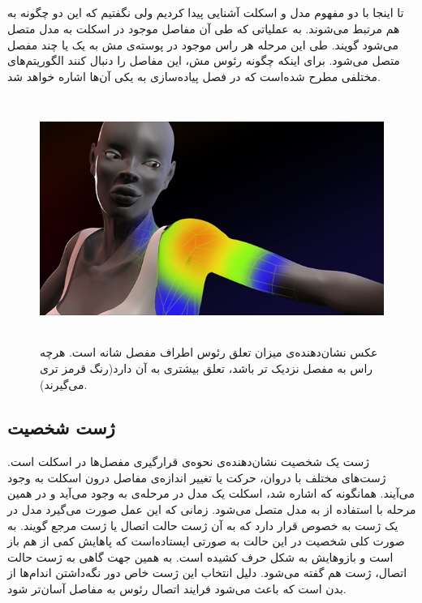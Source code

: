 \subsection{
}

تا اینجا با دو مفهوم مدل و اسکلت آشنایی پیدا کردیم ولی نگفتیم که این دو چگونه به هم مرتبط می‌شوند.
به عملیاتی که طی آن مفاصل موجود در اسکلت به مدل متصل می‌شود 
گویند.
طی این مرحله هر راس موجود در پوسته‌ی مش به یک یا چند مفصل متصل می‌شود.
برای اینکه چگونه رئوس مش، این مفاصل را دنبال کنند الگوریتم‌های مختلفی مطرح شده‌است که در فصل پیاده‌سازی به یکی آن‌ها اشاره ‌خواهد شد.

\begin{figure}[ht]
	\centerline{\includegraphics[width=\textwidth,height=8cm,keepaspectratio]{Figures/Ch2/Skinning.png}}

	\caption{عکس نشان‌دهنده‌ی میزان تعلق رئوس اطراف مفصل شانه است. هرچه راس به مفصل نزدیک تر باشد، تعلق بیشتری به آن دارد(رنگ قرمز تری می‌گیرند).\cite{SkinningSource}}
	\label{fig:Skinning}
\end{figure}




\subsection{ژست شخصیت}

ژست یک شخصیت نشان‌دهنده‌ی نحوه‌ی قرارگیری مفصل‌ها در اسکلت است. ژست‌های مختلف با دروان، حرکت یا تغییر اندازه‌ی مفاصل درون اسکلت به وجود می‌‌آیند.
همانگونه که اشاره شد، اسکلت یک مدل در مرحله‌ی 
به وجود می‌‌آید و در همین مرحله با استفاده از 
 به مدل متصل می‌شود. زمانی که این عمل صورت می‌گیرد مدل در یک ژست به خصوص قرار دارد که به آن ژست حالت اتصال
یا
ژست مرجع
گویند.
به صورت کلی شخصیت در این حالت به صورتی ایستاده‌است که پاهایش کمی از هم باز است و 
بازو‌هایش به شکل حرف
کشیده است. به همین جهت گاهی به ژست حالت اتصال،
ژست
هم گفته می‌شود.
دلیل انتخاب این ژست خاص دور نگه‌داشتن اندام‌ها از بدن است که باعث می‌شود
فرایند اتصال رئوس به مفاصل آسان‌تر شود.

